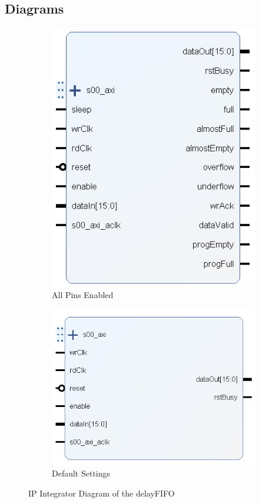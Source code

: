 \documentclass[11pt]{article}
\begin{document}
\subsection{Diagrams}
\begin{figure}[H]
	\centering
	\begin{subfigure}[b]{0.4\linewidth}
		\includegraphics[width=\linewidth]{images/delay_FIFO}
		\caption{All Pins Enabled}
	\end{subfigure}
	\begin{subfigure}[b]{0.4\linewidth}
		\includegraphics[width=\linewidth]{images/delay_FIFO_default}
		\caption{Default Settings}
	\end{subfigure}
	\caption{IP Integrator Diagram of the delay\textunderscore FIFO}
\end{figure}
\end{document}
